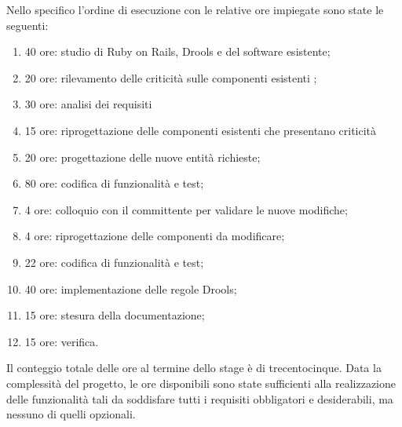 Nello specifico l'ordine di esecuzione con le relative ore impiegate sono state le seguenti:
\begin{enumerate}
	\item	40 ore:     studio di Ruby on Rails, Drools e del software esistente;
	\item	20 ore:     rilevamento delle  criticità sulle componenti esistenti ;
	\item	30 ore:		analisi dei requisiti
	\item	15 ore:		riprogettazione delle componenti esistenti che presentano criticità
	\item	20 ore:     progettazione delle nuove entità richieste;
	\item	80 ore:     codifica di funzionalità e test;
	\item	4 ore:       colloquio con il committente per validare le nuove modifiche;
	\item 	4 ore:		 riprogettazione delle componenti da modificare;
	\item  	22 ore:	 	codifica di funzionalità e test;
	\item	40 ore:		implementazione delle regole Drools;
	\item 	15 ore:		 stesura della documentazione;
	\item	15 ore: 	verifica.
\end{enumerate}

Il conteggio totale delle ore al termine dello stage è di trecentocinque.
Data la complessità del progetto, le ore disponibili sono state sufficienti alla realizzazione delle funzionalità tali da soddisfare tutti i requisiti obbligatori e desiderabili, ma nessuno di quelli opzionali.